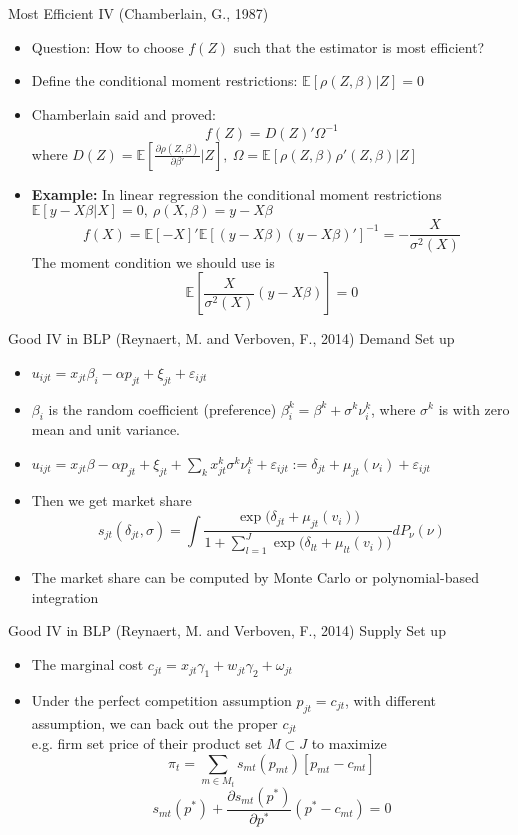 \documentclass[10pt]{beamer}
\begin{document}
\begin{frame}{Most Efficient IV (Chamberlain, G., 1987)}
\begin{itemize}
	\item Question: How to choose $f(Z)$ such that the estimator is most efficient?
	\item Define the conditional moment restrictions: $\mathbb{E}[\rho(Z,\beta)|Z]=0$ 
	\item Chamberlain said and proved:
	$$f(Z) = D(Z)'\Omega^{-1}$$
	where $D(Z)=\mathbb{E}[\frac{\partial \rho(Z,\beta)}{\partial \beta'}|Z],\ \Omega = \mathbb{E}[\rho(Z,\beta)\rho'(Z,\beta)|Z]$
	\item \textbf{Example:} In linear regression the conditional moment restrictions $\mathbb{E}[y-X\beta|X]=0,\ \rho(X,\beta) = y-X\beta$
	$$f(X) = \mathbb{E}[-X]'\mathbb{E}[(y-X\beta)(y-X\beta)']^{-1}=-\frac{X}{\sigma^2(X)}$$
	The moment condition we should use is $$\mathbb{E}[\frac{X}{\sigma^2(X)}(y-X\beta)]=0$$
\end{itemize}

\end{frame}



\begin{frame}{Good IV in BLP (Reynaert, M. and Verboven, F., 2014)}
Demand Set up
\begin{itemize}
	\item $u_{ijt}=x_{jt}\beta_i-\alpha p_{jt}+\xi_{jt}+\varepsilon_{ijt}$ 
	\item $\beta_i$ is the random coefficient (preference) $\beta_i^k = \beta^k + \sigma^k \nu_i^k$, where $\sigma^k$ is with zero mean and unit variance.
	\item $u_{ijt}=x_{jt}\beta-\alpha p_{jt}+\xi_{jt}+\sum_k x_{jt}^k\sigma^k\nu_i^k+\varepsilon_{ijt}:=\delta_{jt}+\mu_{jt}(\nu_i)+\varepsilon_{ijt}$
	\item Then we get market share
	$$s_{jt}(\delta_{jt},\sigma)=\int\frac{\exp\bigg(\delta_{jt}+\mu_{jt}(v_i)\bigg)}{1+\sum_{l=1}^J\exp\bigg(\delta_{lt}+\mu_{lt}(v_i)\bigg)}dP_\nu(\nu)$$
	\item The market share can be computed by Monte Carlo or polynomial-based integration
\end{itemize}
\end{frame}


\begin{frame}{Good IV in BLP (Reynaert, M. and Verboven, F., 2014)}
Supply Set up
\begin{itemize}
	\item The marginal cost $c_{jt}=x_{jt}\gamma_1+w_{jt}\gamma_2+\omega_{jt}$
	\item Under the perfect competition assumption $p_{jt}=c_{jt}$, with different assumption, we can back out the proper $c_{jt}$\\
	e.g. firm set price of their product set $M\subset J$ to maximize
	$$\pi_t = \sum_{m\in M_t}s_{mt}(p_{mt})[p_{mt}-c_{mt}]$$
	$$s_{mt}(p^*)+\frac{\partial s_{mt}(p^*)}{\partial p^*}(p^*-c_{mt})=0$$ 
\end{itemize}
\end{frame}
\end{document}

